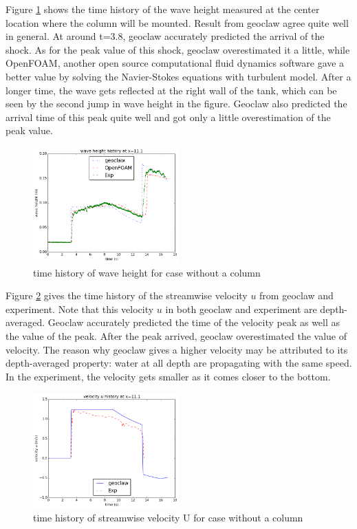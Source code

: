 \documentclass[11pt]{article}
\begin{document}
Figure \ref{fig:waveheight_nocolumn} shows the time history of the wave height measured at the center location where the column will be mounted. 
Result from geoclaw agree quite well in general. At around t=3.8, geoclaw accurately predicted the arrival of the shock. 
As for the peak value of this shock, geoclaw overestimated it a little, while OpenFOAM, another open source computational fluid dynamics software gave a better value by solving the Navier-Stokes equations with turbulent model.
After a longer time, the wave gets reflected at the right wall of the tank, which can be seen by the second jump in wave height in the figure. 
Geoclaw also predicted the arrival time of this peak quite well and got only a little overestimation of the peak value.
\begin{figure}[h!]
    \centering
    \includegraphics[width=0.5\textwidth]{./plots/waveheight_nocolumn}
    \caption{time history of wave height for case without a column}
    \label{fig:waveheight_nocolumn}
\end{figure}

Figure \ref{fig:velocityU_nocolumn} gives the time history of the streamwise velocity $u$ from geoclaw and experiment. 
Note that this velocity $u$ in both geoclaw and experiment are depth-averaged. 
Geoclaw accurately predicted the time of the velocity peak as well as the value of the peak. 
After the peak arrived, geoclaw overestimated the value of velocity.
The reason why geoclaw gives a higher velocity may be attributed to its depth-averaged property: water at all depth are propagating with the same speed. In the experiment, the velocity gets smaller as it comes closer to the bottom. 
\begin{figure}[h!]
    \centering
    \includegraphics[width=0.5\textwidth]{./plots/velocityU_nocolumn}
    \caption{time history of streamwise velocity U for case without a column}
    \label{fig:velocityU_nocolumn}
\end{figure}
\end{document}
